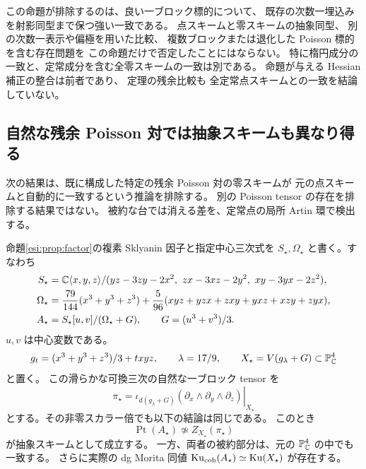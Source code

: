 \begin{remark}[埋込み一致と抽象スキーム同型の区別]
この命題が排除するのは、良い一ブロック標的について、
既存の次数一埋込みを射影同型まで保つ強い一致である。
点スキームと零スキームの抽象同型、
別の次数一表示や偏極を用いた比較、
複数ブロックまたは退化した Poisson 標的を含む存在問題を
この命題だけで否定したことにはならない。
特に楕円成分の一致と、定常成分を含む全零スキームの一致は別である。
命題が与える Hessian 補正の整合は前者であり、
定理の残余比較も
全定常点スキームとの一致を結論していない。
\end{remark}

\subsection{自然な残余 Poisson 対では抽象スキームも異なり得る}

次の結果は、既に構成した特定の残余 Poisson 対の零スキームが
元の点スキームと自動的に一致するという推論を排除する。
別の Poisson tensor の存在を排除する結果ではない。
被約な台では消える差を、定常点の局所 Artin 環で検出する。

\begin{proposition}
\label{ppz:prop:split-artin-obstruction}
命題\ref{esi:prop:factor}の複素 Sklyanin 因子と指定中心三次式を
$S_\star,\Omega_\star$ と書く。すなわち
\begin{equation}\label{ppz:eq:explicit-pair}
 \begin{split}
 S_\star&=\mathbb C\langle x,y,z\rangle/
 (yz-3zy-2x^2,\ zx-3xz-2y^2,\ xy-3yx-2z^2),\\
 \Omega_\star&=\frac{79}{144}(x^3+y^3+z^3)
       +\frac5{96}(xyz+yzx+zxy+yxz+xzy+zyx),\\
 A_\star&=S_\star[u,v]/(\Omega_\star+G),\qquad
 G=(u^3+v^3)/3.
 \end{split}
\end{equation}
$u,v$ は中心変数である。
\[
 g_t=(x^3+y^3+z^3)/3+txyz,\qquad
 \lambda=17/9,\qquad X_\star=V(g_\lambda+G)\subset\mathbb P^4_\mathbb C
\]
と置く。
この滑らかな可換三次の自然な一ブロック tensor を
\[
 \pi_\star
 =\left.\iota_{d(g_\lambda+G)}
       (\partial_x\wedge\partial_y\wedge\partial_z)
   \right|_{X_\star}
\]
とする。その非零スカラー倍でも以下の結論は同じである。
このとき
\begin{equation}\label{ppz:eq:split-artin-nonisom}
 \operatorname{Pt}(A_\star)\not\simeq Z_{X_\star}(\pi_\star)
\end{equation}
が抽象スキームとして成立する。
一方、両者の被約部分は、元の $\mathbb P^4_\mathbb C$ の中でも一致する。
さらに実際の dg Morita 同値
$\operatorname{Ku}_{\mathrm{coh}}(A_\star)\simeq\operatorname{Ku}(X_\star)$ が存在する。
\end{proposition}

